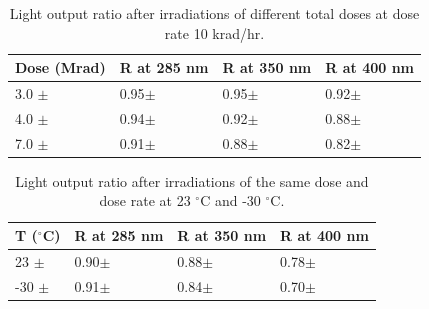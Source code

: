 \documentclass[preprint,12pt]{elsarticle}
\begin{document}
\begin{table}[!ht]
\centering
  \caption{Light output ratio after irradiations of different total doses at dose rate 10 krad/hr.}
  \begin{tabular}{l|l|l|l}
    \hline
    Dose (Mrad)  & R at 285 nm	& R at 350 nm	& R at 400 nm    \\ \hline 
    3.0 $\pm$    & 0.95$\pm$	& 0.95$\pm$	& 0.92$\pm$   \\ \hline
    4.0 $\pm$    & 0.94$\pm$	& 0.92$\pm$	& 0.88$\pm$   \\ \hline
    7.0 $\pm$    & 0.91$\pm$	& 0.88$\pm$	& 0.82$\pm$   \\ 
    \hline
  \end{tabular}
  \label{table:2}
\end{table}

\begin{table}[!ht]
\centering
  \caption{Light output ratio after irradiations of the same dose and dose rate at 23 $^\circ$C and -30 $^\circ$C.}
  \begin{tabular}{l|l|l|l}
    \hline
    T ($^\circ$C)  & R at 285 nm	& R at 350 nm	& R at 400 nm    \\ \hline 
    23  $\pm$    & 0.90$\pm$	& 0.88$\pm$	& 0.78$\pm$   \\ \hline
    -30 $\pm$    & 0.91$\pm$	& 0.84$\pm$	& 0.70$\pm$   \\ 
    \hline
  \end{tabular}
  \label{table:3}
\end{table}
\end{document}
